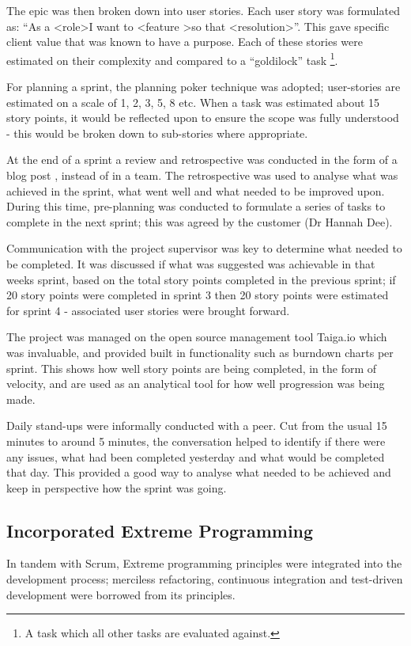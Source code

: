 The epic was then broken down into user stories. Each user story was formulated as: ``As a \textless role\textgreater I want to \textless feature \textgreater so that \textless resolution\textgreater''. This gave specific client value that was known to have a purpose. Each of these stories were estimated on their complexity and compared to a ``goldilock'' task \footnote{A task which all other tasks are evaluated against.}.

For planning a sprint, the planning poker \cite{citeulike:14014357} technique was adopted; user-stories are estimated on a scale of 1, 2, 3, 5, 8 etc. When a task was estimated about 15 story points, it would be reflected upon to ensure the scope was fully understood - this would be broken down to sub-stories where appropriate.

At the end of a sprint a review and retrospective was conducted in the form of a blog post \cite{citeulike:14014367}, instead of in a team. The retrospective was used to analyse what was achieved in the sprint, what went well and what needed to be improved upon. During this time, pre-planning was conducted to formulate a series of tasks to complete in the next sprint; this was agreed by the customer (Dr Hannah Dee).

Communication with the project supervisor was key to determine what needed to be completed. It was discussed if what was suggested was achievable in that weeks sprint, based on the total story points completed in the previous sprint; if 20 story points were completed in sprint 3 then 20 story points were estimated for sprint 4 - associated user stories were brought forward.

The project was managed on the open source management tool Taiga.io \cite{citeulike:14014360} which was invaluable, and provided built in functionality such as burndown charts per sprint. This shows how well story points are being completed, in the form of velocity, and are used as an analytical tool for how well progression was being made.

Daily stand-ups were informally conducted with a peer. Cut from the usual 15 minutes to around 5 minutes, the conversation helped to identify if there were any issues, what had been completed yesterday and what would be completed that day. This provided a good way to analyse what needed to be achieved and keep in perspective how the sprint was going.

\subsection{Incorporated Extreme Programming}
In tandem with Scrum, Extreme programming \cite{citeulike:13915786} principles were integrated into the development process; merciless refactoring, continuous integration and test-driven development were borrowed from its principles.

